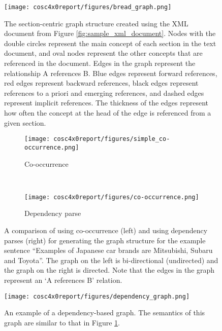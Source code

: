 \documentclass[12pt]{article}
\begin{document}

\begin{figure}
    \centering
    \texttt{[image: cosc4x0report/figures/bread\_graph.png]}
    \caption{The section-centric graph structure created using the XML document from Figure \ref{fig:sample_xml_document}. Nodes with the double circles represent the main concept of each section in the text document, and oval nodes represent the other concepts that are referenced in the document. Edges in the graph represent the relationship A references B. Blue edges represent forward references, red edges represent backward references, black edges represent references to a priori and emerging references, and dashed edges represent implicit references.
    The thickness of the edges represent how often the concept at the head of the edge is referenced from a given section.}
    \label{fig:graph_example}
\end{figure}

\begin{figure}
    \centering
    
    \begin{subfigure}[t]{0.45\linewidth}
        \centering
        \texttt{[image: cosc4x0report/figures/simple\_co-occurrence.png]}
        \caption{Co-occurrence}
        \label{fig:simple co-occurrence}
    \end{subfigure}
    ~
    \begin{subfigure}[t]{0.45\linewidth}
        \centering
        \texttt{[image: cosc4x0report/figures/co-occurrence.png]}
        \caption{Dependency parse}
        \label{fig:co-occurrence}
    \end{subfigure}
    
    \caption{A comparison of using co-occurrence (left) and using dependency parses (right) for generating the graph structure for the example sentence ``Examples of Japanese car brands are Mitsubishi, Subaru and Toyota''. The graph on the left is bi-directional (undirected) and the graph on the right is directed. Note that the edges in the graph represent an `A references B' relation.}
    \label{fig:co-occurrence method comparison}
\end{figure}

\begin{figure}
    \centering
    \texttt{[image: cosc4x0report/figures/dependency\_graph.png]}
    \caption{An example of a dependency-based graph. The semantics of this graph are similar to that in Figure \ref{fig:graph_example}.}
    \label{fig:dependency_graph_example}
\end{figure}
\end{document}
